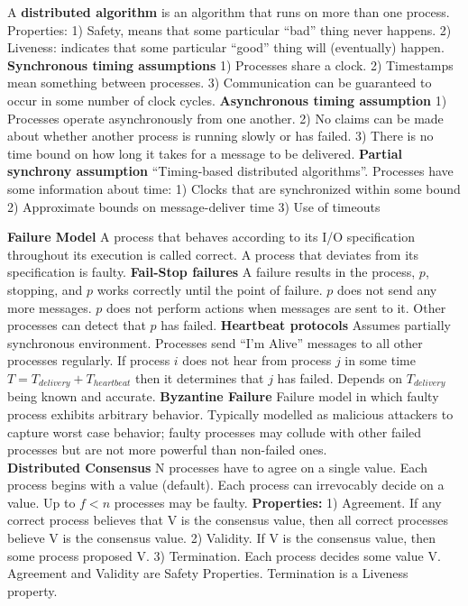 \documentclass[9pt,landscape]{article}
\begin{document}
\begin{multicols}{3}
A {\bf distributed algorithm} is an algorithm that runs on more than one process. Properties: 1) Safety, means that some particular ``bad'' thing never happens. 2) Liveness: indicates that some particular ``good'' thing will (eventually) happen.\\
{\bf Synchronous timing assumptions} 
1) Processes share a clock. 2) Timestamps mean something between processes. 3) Communication can be guaranteed to occur in some number of clock cycles.
{\bf Asynchronous timing assumption}
1) Processes operate asynchronously from one another.
2) No claims can be made about whether another process is running slowly or has failed.
3) There is no time bound on how long it takes for a message to be delivered.
{\bf Partial synchrony assumption} ``Timing-based distributed algorithms''. Processes have some information about time:
1) Clocks that are synchronized within some bound 
2) Approximate bounds on message-deliver time
3) Use of timeouts

{\bf Failure Model} A process that behaves according to its I/O specification throughout its execution is called correct. A process that deviates from its specification is faulty.
{\bf Fail-Stop failures} A failure results in the process, $p$, stopping, and $p$ works correctly until the point of failure. $p$ does not send any more messages. $p$ does not perform actions when messages are sent to it. Other processes can detect that $p$ has failed.
{\bf Heartbeat protocols} Assumes partially synchronous environment. Processes send “I’m Alive” messages to all other processes regularly. If process $i$ does not hear from process $j$ in some time $T = T_{delivery} + T_{heartbeat}$ then it determines that $j$ has failed. Depends on $T_{delivery}$ being known and accurate.
{\bf Byzantine Failure} Failure model in which faulty process exhibits arbitrary behavior. 
Typically modelled as malicious attackers to capture worst case behavior; 
faulty processes may collude with other failed processes but are not more 
powerful than non-failed ones.\\

{\bf Distributed Consensus} N processes have to agree on a single value. Each process begins with a value (default). Each process can irrevocably decide on a value. Up to $f < n$ processes may be faulty. {\bf Properties:} 
1) Agreement. If any correct process believes that V is the consensus value, then all correct processes believe V is the consensus value.
2) Validity. If V is the consensus value, then some process proposed V.
3) Termination. Each process decides some value V. 
Agreement and Validity are Safety Properties. Termination is a Liveness property.


\end{multicols}
\end{document}
